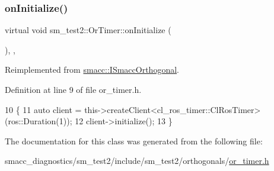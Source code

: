 \subsubsection{\texorpdfstring{on\+Initialize()}{onInitialize()}}
{\footnotesize\ttfamily virtual void sm\+\_\+test2\+::\+Or\+Timer\+::on\+Initialize (\begin{DoxyParamCaption}{ }\end{DoxyParamCaption})\hspace{0.3cm}{\ttfamily [inline]}, {\ttfamily [override]}, {\ttfamily [virtual]}}



Reimplemented from \hyperlink{classsmacc_1_1ISmaccOrthogonal_a6bb31c620cb64dd7b8417f8705c79c7a}{smacc\+::\+I\+Smacc\+Orthogonal}.



Definition at line 9 of file or\+\_\+timer.\+h.


\begin{DoxyCode}
10     \{
11         \textcolor{keyword}{auto} client = this->createClient<cl\_ros\_timer::ClRosTimer>(ros::Duration(1));
12         client->initialize();
13     \}
\end{DoxyCode}


The documentation for this class was generated from the following file\+:\begin{DoxyCompactItemize}
\item 
smacc\+\_\+diagnostics/sm\+\_\+test2/include/sm\+\_\+test2/orthogonals/\hyperlink{smacc__diagnostics_2sm__test2_2include_2sm__test2_2orthogonals_2or__timer_8h}{or\+\_\+timer.\+h}\end{DoxyCompactItemize}
